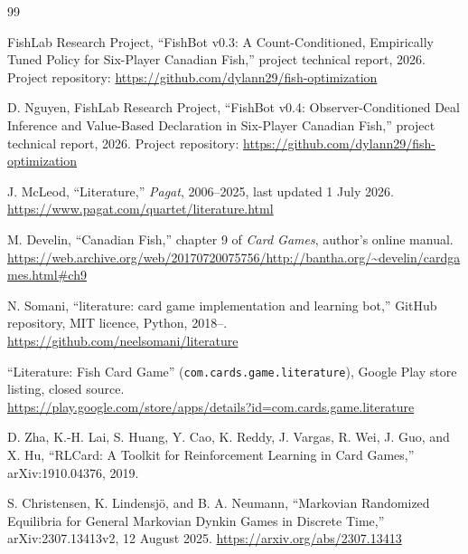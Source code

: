 \documentclass[11pt]{article}
\theoremstyle{definition}
\begin{document}
\begin{thebibliography}{99}


FishLab Research Project, ``FishBot v0.3: A Count-Conditioned, Empirically Tuned
Policy for Six-Player Canadian Fish,'' project technical report, 2026. Project
repository: \url{https://github.com/dylann29/fish-optimization}

D. Nguyen, FishLab Research Project, ``FishBot v0.4: Observer-Conditioned Deal
Inference and Value-Based Declaration in Six-Player Canadian Fish,'' project
technical report, 2026. Project repository:
\url{https://github.com/dylann29/fish-optimization}

J. McLeod, ``Literature,'' \emph{Pagat}, 2006--2025, last updated 1 July 2026.\\
\url{https://www.pagat.com/quartet/literature.html}

M. Develin, ``Canadian Fish,'' chapter 9 of \emph{Card Games}, author's online
manual.\\
\url{https://web.archive.org/web/20170720075756/http://bantha.org/~develin/cardgames.html\#ch9}

N. Somani, ``literature: card game implementation and learning bot,'' GitHub
repository, MIT licence, Python, 2018--.\\
\url{https://github.com/neelsomani/literature}

``Literature: Fish Card Game'' (\texttt{com.cards.game.literature}), Google Play
store listing, closed source.\\
\url{https://play.google.com/store/apps/details?id=com.cards.game.literature}

D. Zha, K.-H. Lai, S. Huang, Y. Cao, K. Reddy, J. Vargas, R. Wei, J. Guo, and
X. Hu, ``RLCard: A Toolkit for Reinforcement Learning in Card Games,''
arXiv:1910.04376, 2019.


S. Christensen, K. Lindensj\"o, and B. A. Neumann, ``Markovian Randomized
Equilibria for General Markovian Dynkin Games in Discrete Time,''
arXiv:2307.13413v2, 12 August 2025. \url{https://arxiv.org/abs/2307.13413}


\end{thebibliography}
\end{document}
